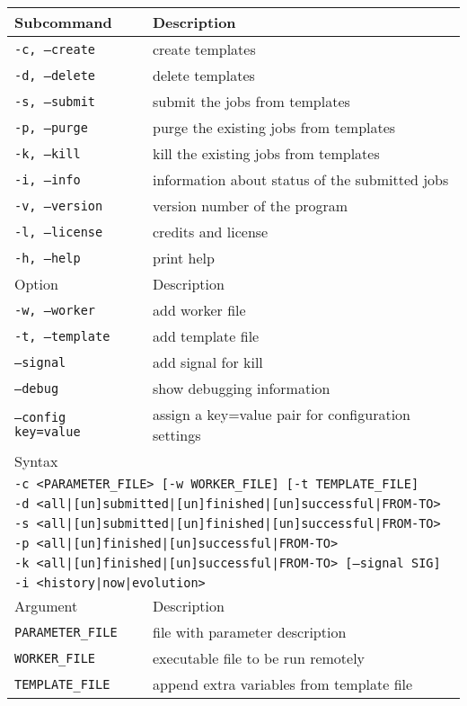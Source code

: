 \documentclass[12pt,a4paper]{article}
\begin{document}
\begin{table}[!th]
\center
\begin{tabular}{ll}
\hline
Subcommand & Description\\
\hline
{\tt -c, --create} & create templates\\
{\tt -d, --delete} & delete templates\\
{\tt -s, --submit} & submit the jobs from templates\\
{\tt -p, --purge} & purge the existing jobs from templates\\
{\tt -k, --kill} & kill the existing jobs from templates\\
{\tt -i, --info} & information about status of the submitted jobs\\
{\tt -v, --version} & version number of the program\\
{\tt -l, --license} & credits and license\\
{\tt -h, --help} & print help\\
\hline
Option & Description\\
\hline
{\tt -w, --worker} & add worker file\\
{\tt -t, --template} & add template file\\
{\tt     --signal} & add signal for kill\\
{\tt     --debug} & show debugging information\\
{\tt     --config key=value}& assign a key=value pair for configuration settings\\
\hline
Syntax\\
\hline
\multicolumn{2}{l}{{\tt -c <PARAMETER\_FILE> [-w WORKER\_FILE] [-t TEMPLATE\_FILE]}}\\
\multicolumn{2}{l}{\tt -d <all|[un]submitted|[un]finished|[un]successful|FROM-TO>}\\
\multicolumn{2}{l}{\tt -s <all|[un]submitted|[un]finished|[un]successful|FROM-TO>}\\
\multicolumn{2}{l}{\tt -p <all|[un]finished|[un]successful|FROM-TO>}\\
\multicolumn{2}{l}{\tt -k <all|[un]finished|[un]successful|FROM-TO> [--signal SIG]}\\
\multicolumn{2}{l}{\tt -i <history|now|evolution>}\\
\hline
Argument & Description\\
\hline
{\tt PARAMETER\_FILE} & file with parameter description\\
{\tt WORKER\_FILE} & executable file to be run remotely\\
{\tt TEMPLATE\_FILE} & append extra variables from template file\\

\end{tabular}
\end{table}
\end{document}
